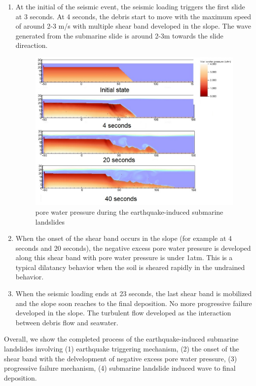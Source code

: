 \documentclass[preprint,12pt]{elsarticle}
\begin{document}
\begin{enumerate}
\item At the initial of the seismic event, the seismic loading triggers the first slide at 3 seconds. At 4 seconds, the debris start to move with the maximum speed of around 2-3 m/s with multiple shear band developed in the slope. The wave generated from the submarine slide is around 2-3m towards the slide direaction.
%
\begin{figure}[H]
\center
\includegraphics[scale=0.5]{PWP.jpeg}
\caption{pore water pressure during the earthquake-induced submarine landslides}
\label{fig:PWP}
\end {figure}
%
%
\item When the onset of the shear band occurs in the slope (for example at 4 seconds and 20 seconds), the negative excess pore water pressure is developed along this shear band with pore water pressure is under 1atm. This is a typical dilatancy behavior when the soil is sheared rapidly in the undrained behavior. 
\item  When the seismic loading ends at 23 seconds, the last shear band is mobilized and the slope soon reaches to the final deposition. No more progressive failure developed in the slope. The turbulent flow developed as the interaction between debris flow and seawater.
\end {enumerate}
%
Overall, we show the completed process of the earthquake-induced submarine landslides involving (1) earthquake triggering mechanism, (2) the onset of the shear band with the delvelopment of negative excess pore water pressure, (3) progressive failure mechanism, (4) submarine landslide induced wave to final deposition.
\end{document}
